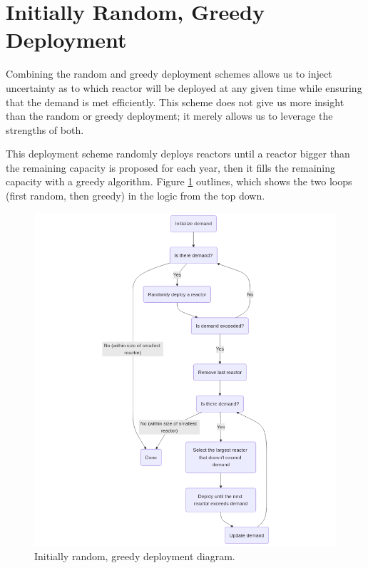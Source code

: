 \section{Initially Random, Greedy Deployment}
\label{sec:initially_random_greedy}

Combining the random and greedy deployment schemes allows us to inject uncertainty as to which reactor will be deployed at any given time while ensuring that the demand is met efficiently. This scheme does not give us more insight than the random or greedy deployment; it merely allows us to leverage the strengths of both.

This deployment scheme randomly deploys reactors until a reactor bigger than the remaining capacity is proposed for each year, then it fills the remaining capacity with a greedy algorithm. Figure \ref{fig:init_random_greedy_diagram} outlines, which shows the two loops (first random, then greedy) in the logic from the top down.

\begin{figure}[H]
    \centering
    \includegraphics[scale=0.55]{images/schemes/random_greedy_diagram.png}
    \caption{Initially random, greedy deployment diagram.}
    \label{fig:init_random_greedy_diagram}
\end{figure}

